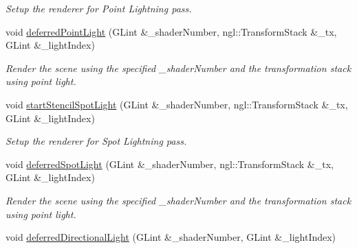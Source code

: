\begin{DoxyCompactItemize}
\begin{DoxyCompactList}\small\item\em Setup the renderer for Point Lightning pass. \end{DoxyCompactList}\item 
\hypertarget{class_deferred_shading_ae9e5e37687b9a8658e99e97c86cc87fe}{void \hyperlink{class_deferred_shading_ae9e5e37687b9a8658e99e97c86cc87fe}{deferred\-Point\-Light} (G\-Lint \&\-\_\-shader\-Number, ngl\-::\-Transform\-Stack \&\-\_\-tx, G\-Lint \&\-\_\-light\-Index)}\label{class_deferred_shading_ae9e5e37687b9a8658e99e97c86cc87fe}

\begin{DoxyCompactList}\small\item\em Render the scene using the specified \-\_\-shader\-Number and the transformation stack using point light. \end{DoxyCompactList}\item 
\hypertarget{class_deferred_shading_aabd36b11f4659769486298e2c17d0d3a}{void \hyperlink{class_deferred_shading_aabd36b11f4659769486298e2c17d0d3a}{start\-Stencil\-Spot\-Light} (G\-Lint \&\-\_\-shader\-Number, ngl\-::\-Transform\-Stack \&\-\_\-tx, G\-Lint \&\-\_\-light\-Index)}\label{class_deferred_shading_aabd36b11f4659769486298e2c17d0d3a}

\begin{DoxyCompactList}\small\item\em Setup the renderer for Spot Lightning pass. \end{DoxyCompactList}\item 
\hypertarget{class_deferred_shading_a173c7b9f47fc7274f2959ec64f8baa56}{void \hyperlink{class_deferred_shading_a173c7b9f47fc7274f2959ec64f8baa56}{deferred\-Spot\-Light} (G\-Lint \&\-\_\-shader\-Number, ngl\-::\-Transform\-Stack \&\-\_\-tx, G\-Lint \&\-\_\-light\-Index)}\label{class_deferred_shading_a173c7b9f47fc7274f2959ec64f8baa56}

\begin{DoxyCompactList}\small\item\em Render the scene using the specified \-\_\-shader\-Number and the transformation stack using point light. \end{DoxyCompactList}\item 
\hypertarget{class_deferred_shading_a3e16121405f0218c7cfc0b48f7d96236}{void \hyperlink{class_deferred_shading_a3e16121405f0218c7cfc0b48f7d96236}{deferred\-Directional\-Light} (G\-Lint \&\-\_\-shader\-Number, G\-Lint \&\-\_\-light\-Index)}\label{class_deferred_shading_a3e16121405f0218c7cfc0b48f7d96236}


\end{DoxyCompactItemize}
